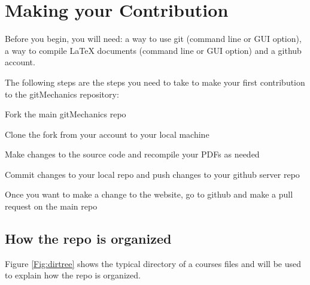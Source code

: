 \section{Making your Contribution}


Before you begin, you will need: a way to use git (command line or GUI option), a way to compile \LaTeX{} documents (command line or GUI option) and a github account.

The following steps are the steps you need to take to make your first contribution to the gitMechanics repository:
\begin{greenfig}
\begin{todolist}
	\item Fork the main gitMechanics repo
	\item Clone the fork from your account to your local machine
	\item Make changes to the source code and recompile your PDFs as needed
	\item Commit changes to your local repo and push changes to your github server repo
	\item Once you want to make a change to the website, go to github and make a pull request on the main repo
\end{todolist}
\end{greenfig}

\subsection{How the repo is organized}

Figure \ref{Fig:dirtree} shows the typical directory of a courses files and will be used to explain how the repo is organized.




